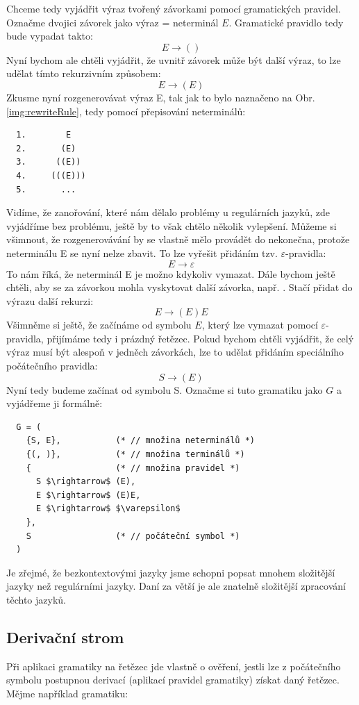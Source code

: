 Chceme tedy vyjádřit výraz tvořený závorkami pomocí gramatických pravidel.
Označme dvojici závorek jako výraz = neterminál $E$. Gramatické pravidlo tedy bude
vypadat takto:
\[E \rightarrow ()\]
Nyní bychom ale chtěli vyjádřit, že uvnitř závorek může být další výraz, to
lze udělat tímto rekurzivním způsobem:
\[E \rightarrow (E)\]
Zkusme nyní rozgenerovávat výraz E, tak jak to bylo naznačeno na Obr. \ref{img:rewriteRule},
tedy pomocí přepisování neterminálů:
\begin{lstlisting}
  1.        E
  2.       (E)
  3.      ((E))
  4.     (((E)))
  5.       ...
\end{lstlisting}
Vidíme, že zanořování, které nám dělalo problémy u regulárních jazyků, zde vyjádříme bez problému,
ještě by to však chtělo několik vylepšení.
Můžeme si všimnout, že rozgenerovávání by se vlastně mělo provádět do nekonečna,
protože neterminálu E se nyní nelze zbavit. To lze vyřešit přidáním tzv.
$\varepsilon$-pravidla:
\[E \rightarrow \varepsilon\]
To nám říká, že neterminál E je možno kdykoliv vymazat. Dále bychom ještě chtěli,
aby se za závorkou mohla vyskytovat další závorka, např. \symb{(()())}.
Stačí přidat do výrazu další rekurzi:
\[E \rightarrow (E)E\]
Všimněme si ještě, že začínáme od symbolu $E$, který lze vymazat pomocí
$\varepsilon$-pravidla, přijímáme tedy i prázdný řetězec. Pokud bychom chtěli
vyjádřit, že celý výraz musí být alespoň v jedněch závorkách, lze to udělat
přidáním speciálního počátečního pravidla:
\[S \rightarrow (E)\]
Nyní tedy budeme začínat od symbolu S. Označme si tuto gramatiku jako
$G$ a vyjádřeme ji formálně:

\begin{lstlisting}
  G = (
    {S, E},           (* // množina neterminálů *)
    {(, )},           (* // množina terminálů *)
    {                 (* // množina pravidel *)
      S $\rightarrow$ (E),
      E $\rightarrow$ (E)E,
      E $\rightarrow$ $\varepsilon$
    },
    S                 (* // počáteční symbol *)
  )
\end{lstlisting}

Je zřejmé, že bezkontextovými jazyky jsme schopni popsat mnohem
složitější jazyky než regulárními jazyky. Daní za větší 
je ale znatelně složitější zpracování těchto jazyků.

\subsection{Derivační strom}
\label{subsec:derivationTree}
Při aplikaci gramatiky na řetězec jde vlastně o ověření,
jestli lze z počátečního symbolu
postupnou derivací (aplikací pravidel gramatiky) získat daný řetězec.
Mějme například gramatiku:

